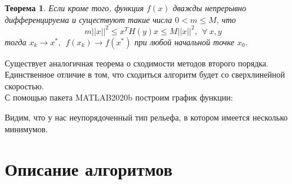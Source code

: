 \documentclass{article}
\newtheorem{theorem}{Теорема}
\begin{document}
\begin{theorem}
Если кроме того, функция $f(x)$ дважды непрерывно дифференцируема и существуют такие числа $0 < m \le M$, что
$$m||x||^{2}\le x^{T}H(y)x\le M||x||^{2},~~\forall~x,y$$
тогда $x_k \longrightarrow x^{*},~~ f(x_k) \longrightarrow f(x^{*})$ при любой начальной точке $x_0$.
\end{theorem}

\noindent Существует аналогичная теорема о сходимости методов второго порядка. Единственное отличие в том, что сходиться алгоритм будет со сверхлинейной скоростью.\\

\noindent С помощью пакета MATLAB2020b построим график функции:
\\
\begin{figure}[H]
\label{fig:image}
\end{figure}

\begin{figure}[H]
\label{fig:image}
\end{figure}
\noindent Видим, что у нас неупорядоченный тип рельефа, в котором имеется несколько минимумов.

\begin{figure}[H]
\label{fig:image}
\end{figure}

\begin{figure}[H]
\label{fig:image}
\end{figure}

\begin{figure}[H]
\label{fig:image}
\end{figure}

\section{Описание алгоритмов}
\end{document}
